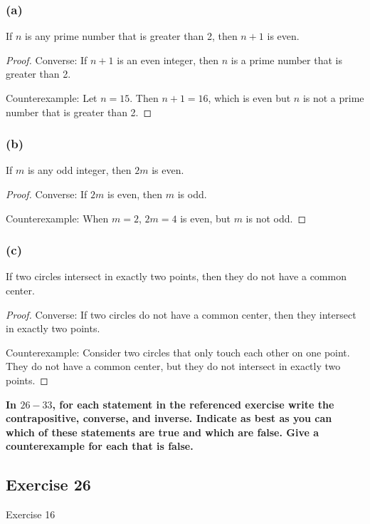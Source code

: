 \documentclass[14pt]{extarticle}
\begin{document}
\subsubsection{(a)}
If $n$ is any prime number that is greater than 2, then $n + 1$ is even.

\begin{proof}
    Converse: If $n + 1$ is an even integer, then $n$ is a prime number that is greater than 2.

    Counterexample: Let $n = 15$. Then $n + 1 = 16$, which is even but $n$ is not a prime number that is greater than 2.
\end{proof}

\subsubsection{(b)}
If $m$ is any odd integer, then $2m$ is even.

\begin{proof}
    Converse: If $2m$ is even, then $m$ is odd.

    Counterexample: When $m = 2$, $2m = 4$ is even, but $m$ is not odd.
\end{proof}

\subsubsection{(c)}
If two circles intersect in exactly two points, then they do not have a common center.

\begin{proof}
    Converse: If two circles do not have a common center, then they intersect in exactly two points.

    Counterexample: Consider two circles that only touch each other on one point. They do not have a common center, but they do not intersect in exactly two points.
\end{proof}

{\bf \color{cyan} In $26-33$, for each statement in the referenced exercise write the contrapositive, converse, and inverse. Indicate as best as you can which of these statements are true and which are false. Give a counterexample for each that is false.}

\subsection{Exercise 26}
Exercise 16
\end{document}
